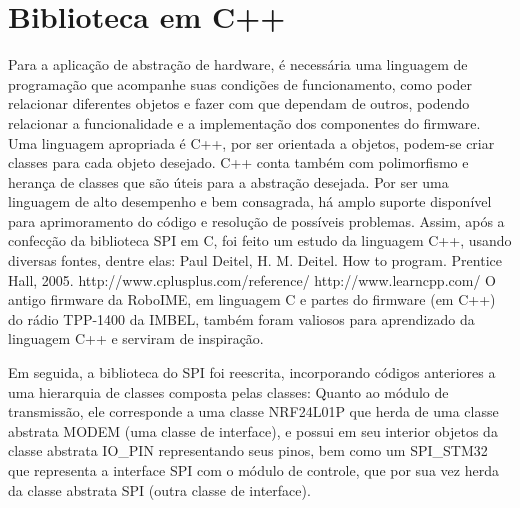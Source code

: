 \chapter{Biblioteca em C++}\label{cap:bibl_cpp}

Para a aplicação de abstração de hardware, é necessária uma linguagem de programação que acompanhe suas condições de funcionamento, como poder relacionar diferentes objetos e fazer com que dependam de outros, podendo relacionar a funcionalidade e a implementação dos componentes do firmware. Uma linguagem apropriada é C++, por ser orientada a objetos, podem-se criar classes para cada objeto desejado. C++ conta também com polimorfismo e herança de classes que são úteis para a abstração desejada. Por ser uma linguagem de alto desempenho e bem consagrada, há amplo suporte disponível para aprimoramento do código e resolução de possíveis problemas.
Assim, após a confecção da biblioteca SPI em C, foi feito um estudo da linguagem C++, usando diversas fontes, dentre elas:
Paul Deitel, H. M. Deitel. How to program. Prentice Hall, 2005.
http://www.cplusplus.com/reference/
http://www.learncpp.com/
O antigo firmware da RoboIME, em linguagem C e partes do firmware (em C++) do rádio TPP-1400 da IMBEL, também foram valiosos para aprendizado da linguagem C++ e serviram de inspiração.

Em seguida, a biblioteca do SPI foi reescrita, incorporando códigos anteriores a uma hierarquia de classes composta pelas classes:
Quanto ao módulo de transmissão, ele corresponde a uma classe NRF24L01P que herda de uma classe abstrata MODEM (uma classe de interface), e possui em seu interior objetos da classe abstrata IO_PIN representando seus pinos, bem como um SPI_STM32 que representa a interface SPI com o módulo de controle, que por sua vez herda da classe abstrata SPI (outra classe de interface).


